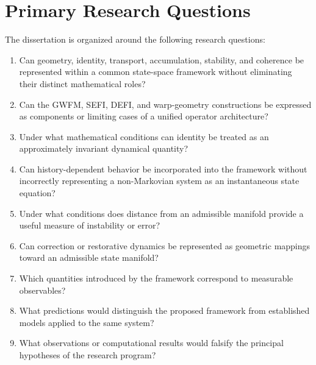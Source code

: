 \documentclass[12pt,oneside]{book}
\begin{document}
\section{Primary Research Questions}
\label{sec:primary-research-questions}

The dissertation is organized around the following research
questions:

\begin{enumerate}[label=\textbf{RQ\arabic*:}, leftmargin=*]

    \item
    Can geometry, identity, transport, accumulation, stability,
    and coherence be represented within a common state-space
    framework without eliminating their distinct mathematical
    roles?

    \item
    Can the GWFM, SEFI, DEFI, and warp-geometry constructions be
    expressed as components or limiting cases of a unified
    operator architecture?

    \item
    Under what mathematical conditions can identity be treated
    as an approximately invariant dynamical quantity?

    \item
    Can history-dependent behavior be incorporated into the
    framework without incorrectly representing a non-Markovian
    system as an instantaneous state equation?

    \item
    Under what conditions does distance from an admissible
    manifold provide a useful measure of instability or error?

    \item
    Can correction or restorative dynamics be represented as
    geometric mappings toward an admissible state manifold?

    \item
    Which quantities introduced by the framework correspond to
    measurable observables?

    \item
    What predictions would distinguish the proposed framework
    from established models applied to the same system?

    \item
    What observations or computational results would falsify
    the principal hypotheses of the research program?

\end{enumerate}
\end{document}
